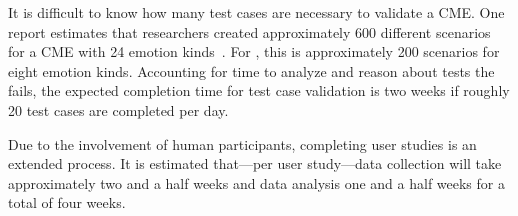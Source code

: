 It is difficult to know how many test cases are necessary to validate a CME.
One report estimates that researchers created approximately 600 different
scenarios for a CME with 24 emotion kinds~\citep{elliott1998hunting}. For
\progname{}, this is approximately 200 scenarios for eight emotion kinds.
Accounting for time to analyze and reason about tests the \progname{} fails,
the expected completion time for test case validation is two weeks if roughly
20 test cases are completed per day.

Due to the involvement of human participants, completing user studies is an
extended process. It is estimated that---per user study---data collection will
take approximately two and a half weeks and data analysis one and a half weeks
for a total of four weeks.
